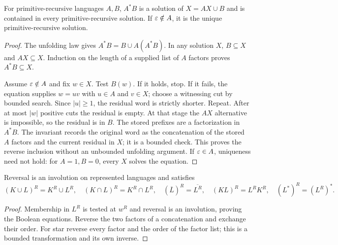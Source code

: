 \begin{theorem}
\label{alg:arden}
For primitive-recursive languages $A,B$, $A^*B$ is a solution of
$X=AX\cup B$ and is contained in every primitive-recursive solution.
If $\varepsilon\notin A$, it is the unique primitive-recursive solution.
\end{theorem}
\begin{proof}
The unfolding law gives $A^*B=B\cup A(A^*B)$. In any solution $X$,
$B\subseteq X$ and $AX\subseteq X$. Induction on the length of a
supplied list of $A$ factors proves $A^*B\subseteq X$.

Assume $\varepsilon\notin A$ and fix $w\in X$. Test $B(w)$. If it holds,
stop. If it fails, the equation supplies $w=uv$ with $u\in A$ and
$v\in X$; choose a witnessing cut by bounded search. Since $|u|\ge1$,
the residual word is strictly shorter. Repeat. After at most $|w|$
positive cuts the residual is empty. At that stage the $AX$ alternative
is impossible, so the residual is in $B$. The stored prefixes are a
factorization in $A^*B$. The invariant records the original word as the
concatenation of the stored $A$ factors and the current residual in $X$;
it is a bounded check. This proves the reverse inclusion without an
unbounded unfolding argument. If $\varepsilon\in A$, uniqueness need not hold:
for $A=1,B=0$, every $X$ solves the equation.
\end{proof}

\begin{theorem}\label{alg:reverse}
Reversal is an involution on represented languages and satisfies
\[
 (K\cup L)^R=K^R\cup L^R,\quad
 (K\cap L)^R=K^R\cap L^R,\quad
 (\overline L)^R=\overline{L^R},\quad
 (KL)^R=L^RK^R,\quad (L^*)^R=(L^R)^*.
\]
\end{theorem}
\begin{proof}
Membership in $L^R$ is tested at $w^R$ and reversal is an involution,
proving the Boolean equations. Reverse the two factors of a concatenation
and exchange their order. For star reverse every factor and the order of
the factor list; this is a bounded transformation and its own inverse.
\end{proof}


